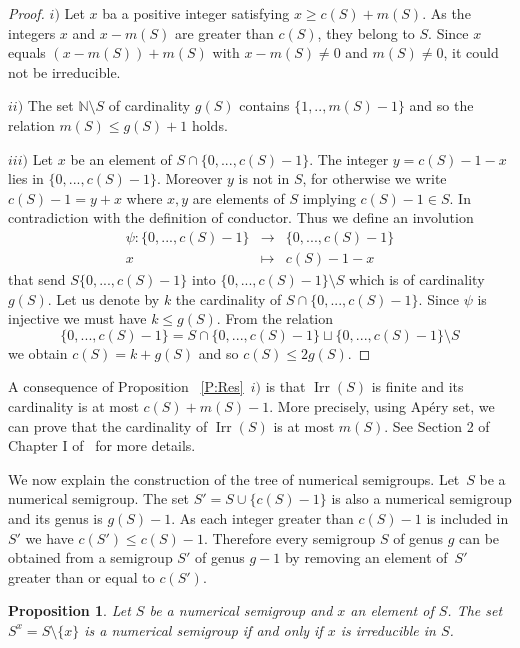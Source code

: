\documentclass[reqno,11pt]{amsart}
\theoremstyle{plain}
\newtheorem{prop}{Proposition}[section]
\theoremstyle{definition}
\renewcommand{\leq}{\leqslant}
\renewcommand{\geq}{\geqslant}
\newcommand{\NN}{\mathbb{N}}
\DeclareMathOperator{\Irr}{Irr}
\begin{document}
\begin{proof}
$i)$ Let $x$ ba a positive integer satisfying $x \geq c(S)+m(S)$. 
As the integers $x$ and $x-m(S)$ are greater than $c(S)$, they belong to $S$.
Since $x$ equals $(x-m(S))+m(S)$ with $x-m(S)\not=0$ and $m(S)\not=0$, it could not be irreducible.

$ii)$ The set $\NN\setminus{S}$ of cardinality $g(S)$ contains $\{1,..,m(S)-1\}$ and so the relation $m(S)\leq g(S)+1$ holds.

$iii)$ Let $x$ be an element of $S\cap\{0,...,c(S)-1\}$. 
The integer $y=c(S)-1-x$ lies in $\{0,...,c(S)-1\}$. 
Moreover $y$ is not in $S$, for otherwise  we write $c(S)-1=y+x$ where $x,y$ are elements of $S$ implying $c(S)-1\in S$. 
In contradiction with the definition of conductor. 
Thus we define an involution 
\[
\begin{array}{rcl}
\psi:\{0,...,c(S)-1\}&\to&\{0,...,c(S)-1\}\\
x&\mapsto&c(S)-1-x
\end{array}
\]
that send $S\{0,...,c(S)-1\}$ into $\{0,...,c(S)-1\}\setminus S$ which is  of cardinality $g(S)$. 
Let us denote by $k$ the cardinality  of $S\cap\{0,...,c(S)-1\}$. 
Since $\psi$ is injective we must have $k\leq g(S)$. 
From the relation 
\[
\{0,...,c(S)-1\}=S\cap\{0,...,c(S)-1\}\sqcup\{0,...,c(S)-1\}\setminus S
\]
 we obtain $c(S)=k+g(S)$ and so $c(S)\leq 2 g(S)$.
\end{proof}

A consequence of Proposition~ \ref{P:Res}~$i)$ is that $\Irr(S)$ is finite and its cardinality is at most $c(S)+m(S)-1$.
More precisely, using Ap\'ery set, we can prove that  the cardinality of $\Irr(S)$ is at most $m(S)$. See Section 2 of Chapter I of~\cite{BookNS} for more details.

We now explain the construction of the tree of numerical semigroups.
Let~$S$ be a numerical semigroup. The set $S'=S\cup\{c(S)-1\}$ is also a numerical  semigroup and its genus is $g(S)-1$. 
As  each integer greater than $c(S)-1$ is included in $S'$ we have $c(S')\leq c(S)-1$. 
Therefore every semigroup $S$ of genus $g$ can be obtained from a semigroup $S'$ of genus $g-1$ by removing an element of~$S'$ greater than or equal to $c(S')$.

\begin{prop}
\label{P:Sx}
Let $S$ be a numerical semigroup and $x$ an element of $S$. The set~$S^x=S\setminus\{x\}$ is a numerical semigroup if and only if $x$ is irreducible in $S$.
\end{prop}
\end{document}

